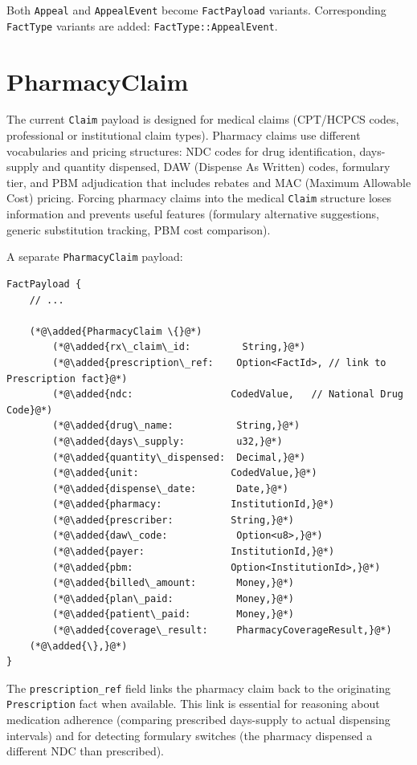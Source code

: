 \documentclass[11pt]{article}
\newcommand{\added}[1]{\textcolor{accentblue}{#1}}
\begin{document}
Both \texttt{Appeal} and \texttt{AppealEvent} become \texttt{FactPayload}
variants. Corresponding \texttt{FactType} variants are added:
\texttt{FactType::AppealEvent}.

\section{PharmacyClaim}
\label{sec:pharmacy}

The current \texttt{Claim} payload is designed for medical claims
(CPT/HCPCS codes, professional or institutional claim types). Pharmacy
claims use different vocabularies and pricing structures: NDC codes for
drug identification, days-supply and quantity dispensed, DAW (Dispense
As Written) codes, formulary tier, and PBM adjudication that includes
rebates and MAC (Maximum Allowable Cost) pricing. Forcing pharmacy
claims into the medical \texttt{Claim} structure loses information and
prevents useful features (formulary alternative suggestions, generic
substitution tracking, PBM cost comparison).

A separate \texttt{PharmacyClaim} payload:

\begin{lstlisting}
FactPayload {
    // ...

    (*@\added{PharmacyClaim \{}@*)
        (*@\added{rx\_claim\_id:         String,}@*)
        (*@\added{prescription\_ref:    Option<FactId>, // link to Prescription fact}@*)
        (*@\added{ndc:                 CodedValue,   // National Drug Code}@*)
        (*@\added{drug\_name:           String,}@*)
        (*@\added{days\_supply:         u32,}@*)
        (*@\added{quantity\_dispensed:  Decimal,}@*)
        (*@\added{unit:                CodedValue,}@*)
        (*@\added{dispense\_date:       Date,}@*)
        (*@\added{pharmacy:            InstitutionId,}@*)
        (*@\added{prescriber:          String,}@*)
        (*@\added{daw\_code:            Option<u8>,}@*)
        (*@\added{payer:               InstitutionId,}@*)
        (*@\added{pbm:                 Option<InstitutionId>,}@*)
        (*@\added{billed\_amount:       Money,}@*)
        (*@\added{plan\_paid:           Money,}@*)
        (*@\added{patient\_paid:        Money,}@*)
        (*@\added{coverage\_result:     PharmacyCoverageResult,}@*)
    (*@\added{\},}@*)
}
\end{lstlisting}

The \texttt{prescription\_ref} field links the pharmacy claim back to
the originating \texttt{Prescription} fact when available. This link is
essential for reasoning about medication adherence (comparing prescribed
days-supply to actual dispensing intervals) and for detecting formulary
switches (the pharmacy dispensed a different NDC than prescribed).
\end{document}

